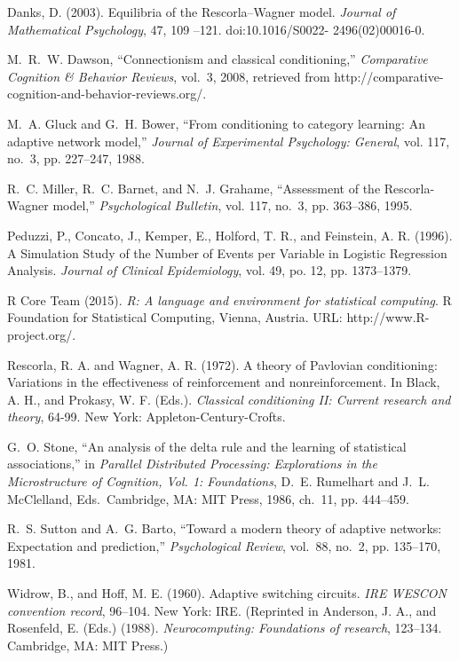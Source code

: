 \documentclass[conference]{IEEEtran}
\begin{document}
\begin{thebibliography}{1}
Danks, D. (2003). Equilibria of the Rescorla–Wagner model. \emph{Journal of Mathematical Psychology}, 47, 109 –121. doi:10.1016/S0022- 2496(02)00016-0.

M.~R.~W. Dawson, ``Connectionism and classical conditioning,'' \emph{Comparative Cognition \& Behavior Reviews}, vol.~3, 2008, retrieved from http://comparative-cognition-and-behavior-reviews.org/.

M.~A. Gluck and G.~H. Bower, ``From conditioning to category learning: An adaptive network model,'' \emph{Journal of Experimental Psychology: General}, vol. 117, no.~3, pp. 227--247, 1988.

R.~C. Miller, R.~C. Barnet, and N.~J. Grahame, ``Assessment of the {Rescorla-Wagner} model,'' \emph{Psychological Bulletin}, vol. 117, no.~3, pp. 363--386, 1995.

Peduzzi, P., Concato, J., Kemper, E., Holford, T. R., and Feinstein, A. R. (1996). A Simulation Study of the Number of Events per Variable in Logistic Regression Analysis. \emph{Journal of Clinical Epidemiology}, vol. 49, po. 12, pp. 1373--1379.

R Core Team (2015). \emph{R: A language and environment for statistical computing}. R Foundation for
Statistical Computing, Vienna, Austria. URL: http://www.R-project.org/.

Rescorla, R. A. and Wagner, A. R. (1972). A theory of Pavlovian conditioning: Variations in the effectiveness of reinforcement and nonreinforcement. In Black, A. H., and Prokasy, W. F. (Eds.). \emph{Classical conditioning II: Current research and theory}, 64-99. New York: Appleton-Century-Crofts. 

G.~O. Stone, ``An analysis of the delta rule and the learning of statistical associations,'' in \emph{Parallel Distributed Processing: Explorations in the Microstructure of Cognition, Vol. 1: Foundations}, D.~E. Rumelhart and J.~L. McClelland, Eds.\ Cambridge, MA: MIT Press, 1986, ch.~11, pp. 444--459.

R.~S. Sutton and A.~G. Barto, ``Toward a modern theory of adaptive networks: Expectation and prediction,'' \emph{Psychological Review}, vol.~88, no.~2, pp. 135--170, 1981.

Widrow, B., and Hoff, M. E. (1960). Adaptive switching circuits. \emph{IRE WESCON convention record}, 96–104. New York: IRE. (Reprinted in Anderson, J. A., and Rosenfeld, E. (Eds.) (1988). \emph{Neurocomputing: Foundations of research}, 123–134. Cambridge, MA: MIT Press.)

\end{thebibliography}

\end{document}
